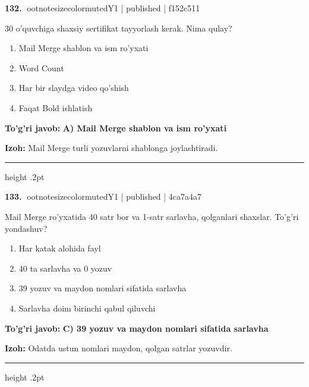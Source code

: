 \documentclass[10pt,a4paper]{article}
\begin{document}
\textbf{\color{ink}132.} {ootnotesizecolor{muted}Y1 | published | f152c511}
\par
30 o'quvchiga shaxsiy sertifikat tayyorlash kerak. Nima qulay?
\begin{enumerate}[label=\Alph*),leftmargin=9mm]
\item Mail Merge shablon va ism ro'yxati
\item Word Count
\item Har bir slaydga video qo'shish
\item Faqat Bold ishlatish
\end{enumerate}
\begin{tcolorbox}[enhanced,breakable,colback=teal!4,colframe=teal!55!black,boxrule=0.45pt,arc=1.2mm,left=2.8mm,right=2.8mm,top=2mm,bottom=2mm]
\textbf{\color{teal}To'g'ri javob:} \textbf{A) Mail Merge shablon va ism ro'yxati}
\par\smallskip
\textbf{Izoh:} Mail Merge turli yozuvlarni shablonga joylashtiradi.
\end{tcolorbox}
\vspace{2mm}\hrule height .2pt\vspace{2mm}

\textbf{\color{ink}133.} {ootnotesizecolor{muted}Y1 | published | 4ca7a4a7}
\par
Mail Merge ro'yxatida 40 satr bor va 1-satr sarlavha, qolganlari shaxslar. To'g'ri yondashuv?
\begin{enumerate}[label=\Alph*),leftmargin=9mm]
\item Har katak alohida fayl
\item 40 ta sarlavha va 0 yozuv
\item 39 yozuv va maydon nomlari sifatida sarlavha
\item Sarlavha doim birinchi qabul qiluvchi
\end{enumerate}
\begin{tcolorbox}[enhanced,breakable,colback=teal!4,colframe=teal!55!black,boxrule=0.45pt,arc=1.2mm,left=2.8mm,right=2.8mm,top=2mm,bottom=2mm]
\textbf{\color{teal}To'g'ri javob:} \textbf{C) 39 yozuv va maydon nomlari sifatida sarlavha}
\par\smallskip
\textbf{Izoh:} Odatda ustun nomlari maydon, qolgan satrlar yozuvdir.
\end{tcolorbox}
\vspace{2mm}\hrule height .2pt\vspace{2mm}
\end{document}
